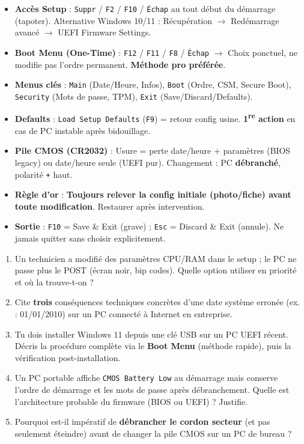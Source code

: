 \documentclass[11pt]{article}
\begin{document}
\begin{aretenir}
\begin{itemize}
  \item \textbf{Accès Setup} : \texttt{Suppr} / \texttt{F2} / \texttt{F10} / \texttt{Échap} au tout début du démarrage (tapoter). Alternative Windows 10/11 : Récupération $\to$ Redémarrage avancé $\to$ UEFI Firmware Settings.
  \item \textbf{Boot Menu (One-Time)} : \texttt{F12} / \texttt{F11} / \texttt{F8} / \texttt{Échap} $\to$ Choix ponctuel, ne modifie pas l'ordre permanent. \textbf{Méthode pro préférée}.
  \item \textbf{Menus clés} : \texttt{Main} (Date/Heure, Infos), \texttt{Boot} (Ordre, CSM, Secure Boot), \texttt{Security} (Mots de passe, TPM), \texttt{Exit} (Save/Discard/Defaults).
  \item \textbf{Defaults} : \texttt{Load Setup Defaults} (\texttt{F9}) = retour config usine. \textbf{1\textsuperscript{re} action} en cas de PC instable après bidouillage.
  \item \textbf{Pile CMOS (CR2032)} : Usure = perte date/heure + paramètres (BIOS legacy) ou date/heure seule (UEFI pur). Changement : PC \textbf{débranché}, polarité \texttt{+} haut.
  \item \textbf{Règle d'or} : \textbf{Toujours relever la config initiale (photo/fiche) avant toute modification}. Restaurer après intervention.
  \item \textbf{Sortie} : \texttt{F10} = Save \& Exit (grave) ; \texttt{Esc} = Discard \& Exit (annule). Ne jamais quitter sans choisir explicitement.
\end{itemize}
\end{aretenir}

\begin{exercice}
\begin{enumerate}
  \item Un technicien a modifié des paramètres CPU/RAM dans le setup ; le PC ne passe plus le POST (écran noir, bip codes). Quelle option utiliser en priorité et où la trouve-t-on ?
  \item Cite \textbf{trois} conséquences techniques concrètes d'une date système erronée (ex. : 01/01/2010) sur un PC connecté à Internet en entreprise.
  \item Tu dois installer Windows 11 depuis une clé USB sur un PC UEFI récent. Décris la procédure complète via le \textbf{Boot Menu} (méthode rapide), puis la vérification post-installation.
  \item Un PC portable affiche \texttt{CMOS Battery Low} au démarrage mais conserve l'ordre de démarrage et les mots de passe après débranchement. Quelle est l'architecture probable du firmware (BIOS ou UEFI) ? Justifie.
  \item Pourquoi est-il impératif de \textbf{débrancher le cordon secteur} (et pas seulement éteindre) avant de changer la pile CMOS sur un PC de bureau ?
\end{enumerate}
\end{exercice}
\end{document}
